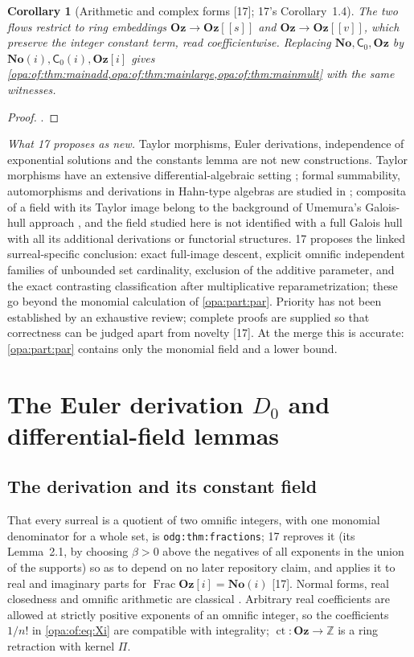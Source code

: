 \documentclass[11pt,oneside]{article}
\numberwithin{equation}{section}
\newtheorem{corollary}[corollary]{Corollary}
\theoremstyle{definition}
\theoremstyle{remark}
\newcommand{\No}{\mathbf{No}}
\newcommand{\Oz}{\mathbf{Oz}}
\newcommand{\Og}{\mathbf{Oz}[i]}
\newcommand{\SC}{\mathbf{No}(i)}
\newcommand{\Z}{\mathbb Z}
\newcommand{\ct}{\operatorname{ct}}
\newcommand{\Frac}{\operatorname{Frac}}
\newcommand{\src}[1]{\textup{\textsf{\small[#1]}}}
\newcommand{\lbl}[1]{\nolinkurl{#1}}
\begin{document}
\begin{corollary}[Arithmetic and complex forms \src{17}; 17's Corollary~1.4]\label{opa:of:cor:mainarith}
The two flows restrict to ring embeddings $\Oz\to\Oz[[s]]$ and $\Oz\to\Oz[[v]]$, which preserve the integer constant
term, read coefficientwise. Replacing $\No,\mathsf C_0,\Oz$ by $\SC,\mathsf C_0(i),\Og$ gives
\cref{opa:of:thm:mainadd,opa:of:thm:mainlarge,opa:of:thm:mainmult} with the same witnesses.
\end{corollary}
\begin{proof}
.
\end{proof}

\emph{What 17 proposes as new.} Taylor morphisms, Euler derivations, independence of exponential solutions and the
constants lemma are not new constructions. Taylor morphisms have an extensive differential-algebraic setting \cite{Ng};
formal summability, automorphisms and derivations in Hahn-type algebras are studied in \cite{BKKPS,KKS}; composita of a
field with its Taylor image belong to the background of Umemura's Galois-hull approach \cite{Heiderich}, and the field
studied here is not identified with a full Galois hull with all its additional derivations or functorial structures.
17 proposes the linked surreal-specific conclusion: exact full-image descent, explicit omnific independent families of
unbounded set cardinality, exclusion of the additive parameter, and the exact contrasting classification after
multiplicative reparametrization; these go beyond the monomial calculation of \cref{opa:part:par}. Priority has not been
established by an exhaustive review; complete proofs are supplied so that correctness can be judged apart from novelty
\src{17}. At the merge this is accurate: \cref{opa:part:par} contains only the monomial field and a lower bound.

\section{The Euler derivation \texorpdfstring{$D_0$}{D0} and differential-field lemmas}\label{opa:of:sec:lemmas}

\subsection{The derivation and its constant field}

That every surreal is a quotient of two omnific integers, with one monomial denominator for a whole set, is
\lbl{odg:thm:fractions}; 17 reproves it (its Lemma~2.1, by choosing $\beta>0$ above the negatives of all exponents in the
union of the supports) so as to depend on no later repository claim, and applies it to real and imaginary parts for
$\Frac\Og=\SC$ \src{17}. Normal forms, real closedness and omnific arithmetic are classical \cite{Conway,Gonshor,LM}.
Arbitrary real coefficients are allowed at strictly positive exponents of an omnific integer, so the coefficients $1/n!$
in \eqref{opa:of:eq:Xi} are compatible with integrality; $\ct:\Oz\to\Z$ is a ring retraction with kernel $\Pi$.
\end{document}

